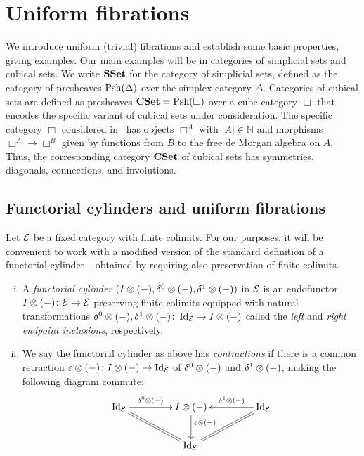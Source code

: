 \documentclass[reqno,10pt,a4paper,oneside,draft]{amsart}
\begin{document}
\section{Uniform fibrations}
\label{sec:unif}

We introduce uniform (trivial) fibrations and establish some basic properties, giving examples. Our main examples
will be in categories of simplicial sets and cubical sets. 
We write $\mathbf{SSet}$ for the category of simplicial sets, defined as the category of presheaves $\mathrm{Psh}(\Delta)$ over the simplex category $\Delta$. Categories of cubical sets are defined as presheaves $\mathbf{CSet} = \mathrm{Psh}(\Box)$ over a cube category $\Box$ that encodes the specific variant of cubical sets under consideration.
The specific category $\Box$ considered in~\cite{cohen-et-al:cubicaltt} has objects $\Box^A$ with $|A| \in \mathbb{N}$ and morphisms $\Box^A \to \Box^B$ given by functions from $B$ to the free de Morgan algebra on $A$.
Thus, the corresponding category $\mathbf{CSet}$ of cubical sets has symmetries, diagonals, connections, and involutions.






\subsection*{Functorial cylinders and uniform fibrations}
Let $\mathcal{E}$ be a fixed category with finite colimits. For our purposes, it will be convenient to 
work with a modified version of the standard definition of a functorial cylinder~\cite{kamps-porter:homotopy}, obtained by requiring also preservation of finite colimits.

\begin{definition} \hfill 
\begin{enumerate}[(i)]
\item A  \emph{functorial cylinder} $(I \otimes (-), \delta^0 \otimes (-), \delta^1 \otimes (-))$ in $\mathcal{E}$ is an endofunctor $I \otimes (-) \colon \mathcal{E} \to \mathcal{E}$ preserving finite colimits
equipped with natural transformations $\delta^0 \otimes (-), \delta^1 \otimes (-) \colon \operatorname{Id}_{\mathcal{E}} \to I \otimes (-)$ called the \emph{left} and \emph{right endpoint inclusions}, respectively.
\item  We say the functorial cylinder as above has \emph{contractions} if there is a common retraction $\varepsilon \otimes (-) \colon I \otimes (-) \to \operatorname{Id}_{\mathcal{E}}$ of $\delta^0 \otimes (-)$ and $\delta^1 \otimes (-)$, making the following diagram commute:
\[
\xymatrix@C+2em{
  \Id_\catE
  \ar[r]^-{\lcyl \otimes (-)}
  \ar@{=}[dr]
&
  \interval \otimes (-)
  \ar[d]^(0.4){\ccyl \otimes (-)}
&
  \Id_\catE
  \ar[l]_-{\rcyl \otimes (-)}
  \ar@{=}[dl]
\\&
  \Id_\catE
\rlap{.}}
\]
\end{enumerate}
\end{definition}
\end{document}
